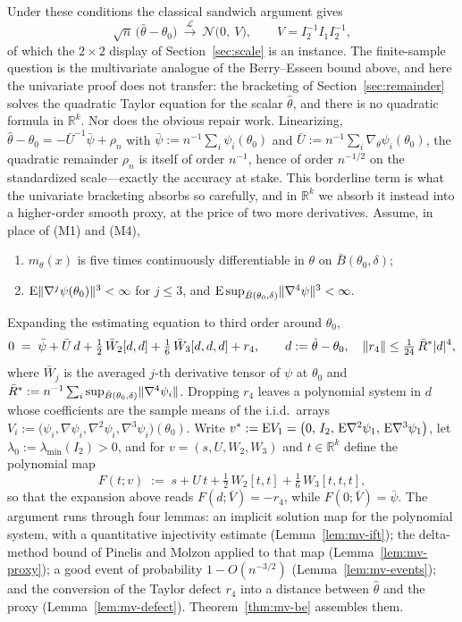 Under these conditions the classical sandwich argument gives
\[
\sqrt{n}\,\big(\hat\theta-\theta_{0}\big)\ \xrightarrow{\mathcal{L}}\ \mathcal{N}\big(0,\ V\big),
\qquad V=I_{2}^{-1}I_{1}I_{2}^{-1},
\]
of which the $2\times2$ display of Section~\ref{sec:scale} is an instance. The finite-sample question is the multivariate analogue of the Berry--Esseen bound above, and here the univariate proof does not transfer: the bracketing of Section~\ref{sec:remainder} solves the quadratic Taylor equation for the scalar $\hat\theta$, and there is no quadratic formula in $\mathbb{R}^{k}$. Nor does the obvious repair work. Linearizing, $\hat\theta-\theta_{0}=-\bar U^{-1}\bar\psi+\rho_{n}$ with $\bar\psi:=n^{-1}\sum_{i}\psi_{i}(\theta_{0})$ and $\bar U:=n^{-1}\sum_{i}\nabla_{\theta}\psi_{i}(\theta_{0})$, the quadratic remainder $\rho_{n}$ is itself of order $n^{-1}$, hence of order $n^{-1/2}$ on the standardized scale---exactly the accuracy at stake. This borderline term is what the univariate bracketing absorbs so carefully, and in $\mathbb{R}^{k}$ we absorb it instead into a higher-order smooth proxy, at the price of two more derivatives. Assume, in place of (M1) and (M4),
\begin{enumerate}
	\item[(M1$'$)] $m_{\theta}(x)$ is five times continuously differentiable in $\theta$ on $\bar B(\theta_{0},\delta)$;
	\item[(M4$'$)] $\mathrm{E}\lVert\nabla^{j}\psi(\theta_{0})\rVert^{3}<\infty$ for $j\le3$, and $\mathrm{E}\sup_{\bar B(\theta_{0},\delta)}\lVert\nabla^{4}\psi\rVert^{3}<\infty$.
\end{enumerate}
Expanding the estimating equation to third order around $\theta_{0}$,
\[
0\;=\;\bar\psi+\bar U\,d+\tfrac12\,\bar W_{2}[d,d]+\tfrac16\,\bar W_{3}[d,d,d]+r_{4},
\qquad d:=\hat\theta-\theta_{0},\quad \lVert r_{4}\rVert\le\tfrac1{24}\,\bar R^{*}\lvert d\rvert^{4},
\]
where $\bar W_{j}$ is the averaged $j$-th derivative tensor of $\psi$ at $\theta_{0}$ and $\bar R^{*}:=n^{-1}\sum_{i}\sup_{\bar B(\theta_{0},\delta)}\lVert\nabla^{4}\psi_{i}\rVert$. Dropping $r_{4}$ leaves a polynomial system in $d$ whose coefficients are the sample means of the i.i.d.\ arrays $V_{i}:=\big(\psi_{i},\nabla\psi_{i},\nabla^{2}\psi_{i},\nabla^{3}\psi_{i}\big)(\theta_{0})$. Write $v^{*}:=\mathrm{E} V_{1}=\big(0,\,I_{2},\,\mathrm{E}\nabla^{2}\psi_{1},\,\mathrm{E}\nabla^{3}\psi_{1}\big)$, let $\lambda_{0}:=\lambda_{\min}(I_{2})>0$, and for $v=(s,U,W_{2},W_{3})$ and $t\in\mathbb{R}^{k}$ define the polynomial map
\[
F(t;v)\;:=\;s+U\,t+\tfrac12\,W_{2}[t,t]+\tfrac16\,W_{3}[t,t,t],
\]
so that the expansion above reads $F(d;\bar V)=-r_{4}$, while $F(0;\bar V)=\bar\psi$. The argument runs through four lemmas: an implicit solution map for the polynomial system, with a quantitative injectivity estimate (Lemma~\ref{lem:mv-ift}); the delta-method bound of Pinelis and Molzon applied to that map (Lemma~\ref{lem:mv-proxy}); a good event of probability $1-O(n^{-3/2})$ (Lemma~\ref{lem:mv-events}); and the conversion of the Taylor defect $r_{4}$ into a distance between $\hat\theta$ and the proxy (Lemma~\ref{lem:mv-defect}). Theorem~\ref{thm:mv-be} assembles them.

